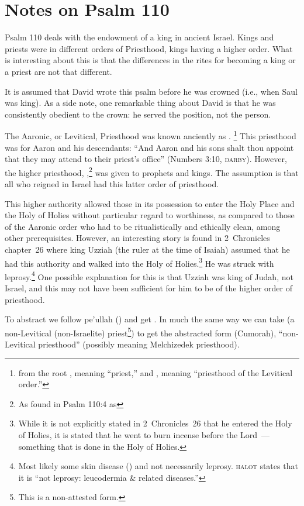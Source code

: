 \section{Notes on Psalm 110}\label{app:psalm-110}
Psalm 110 deals with the endowment of a king in ancient Israel. Kings and priests were in different orders of Priesthood, kings having a higher order. What is interesting about this is that the differences in the rites for becoming a king or a priest are not that different.

It is assumed that David wrote this psalm before he was crowned (i.e., when Saul was king). As a side note, one remarkable thing about David is that he was consistently obedient to the crown: he served the position, not the person.

The Aaronic, or Levitical, Priesthood was known anciently as .%
\footnote{from the root , meaning ``priest,'' and , meaning ``priesthood of the Levitical order.''}
This priesthood was for Aaron and his descendants: ``And Aaron and his sons shalt thou appoint that they may attend to their priest's office'' (Numbers 3:10, \textsc{darby}). However, the higher priesthood, ,\footnote{As found in Psalm 110:4 as } was given to prophets and kings. The assumption is that all who reigned in Israel had this latter order of priesthood.

This higher authority allowed those in its possession to enter the Holy Place and the Holy of Holies without particular regard to worthiness, as compared to those of the Aaronic order who had to be ritualistically and ethically clean, among other prerequisites. However, an interesting story is found in 2~Chronicles chapter~26 where king Uzziah (the ruler at the time of Isaiah) assumed that he had this authority and walked into the Holy of Holies.\footnote{While it is not explicitly stated in 2~Chronicles~26 that he entered the Holy of Holies, it is stated that he went to burn incense before the Lord~--- something that is done in the Holy of Holies.} He was struck with leprosy.\footnote{Most likely some skin disease () and not necessarily leprosy. \textsc{halot} states that it is ``not leprosy: leucodermia \& related diseases.''} One possible explanation for this is that Uzziah was king of Judah, not Israel, and this may not have been sufficient for him to be of the higher order of priesthood.

To abstract  we follow pe'ullah () and get . In much the same way we can take  (a non-Levitical (non-Israelite) priest\footnote{This is a non-attested form.}) to get the abstracted form  (Cumorah), ``non-Levitical priesthood'' (possibly meaning Melchizedek priesthood).
